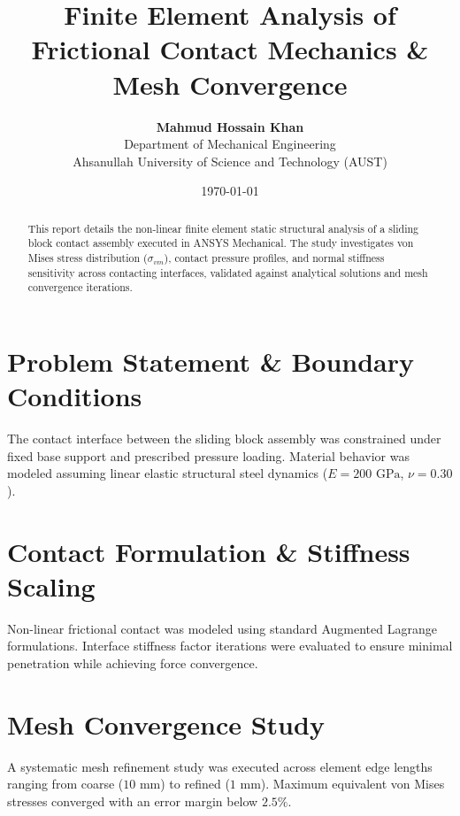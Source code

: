 \documentclass[11pt,a4paper]{article}
\title{\textbf{Finite Element Analysis of Frictional Contact Mechanics \& Mesh Convergence}}
\author{\textbf{Mahmud Hossain Khan} \\ Department of Mechanical Engineering \\ Ahsanullah University of Science and Technology (AUST)}
\date{\today}
\begin{document}
\maketitle

\begin{abstract}
This report details the non-linear finite element static structural analysis of a sliding block contact assembly executed in ANSYS Mechanical. The study investigates von Mises stress distribution ($\sigma_{vm}$), contact pressure profiles, and normal stiffness sensitivity across contacting interfaces, validated against analytical solutions and mesh convergence iterations.
\end{abstract}

\section{Problem Statement \& Boundary Conditions}
The contact interface between the sliding block assembly was constrained under fixed base support and prescribed pressure loading. Material behavior was modeled assuming linear elastic structural steel dynamics ($E = 200\text{ GPa}$, $\nu = 0.30$).

\section{Contact Formulation \& Stiffness Scaling}
Non-linear frictional contact was modeled using standard Augmented Lagrange formulations. Interface stiffness factor iterations were evaluated to ensure minimal penetration while achieving force convergence.

\section{Mesh Convergence Study}
A systematic mesh refinement study was executed across element edge lengths ranging from coarse ($10\text{ mm}$) to refined ($1\text{ mm}$). Maximum equivalent von Mises stresses converged with an error margin below $2.5\%$.
\end{document}
